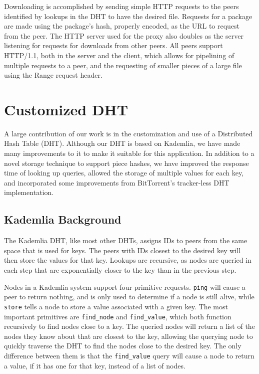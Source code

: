 \documentclass[conference]{IEEEtran}
\begin{document}
Downloading is accomplished by sending simple HTTP requests to the
peers identified by lookups in the DHT to have the desired file.
Requests for a package are made using the package's hash, properly
encoded, as the URL to request from the peer. The HTTP server used
for the proxy also doubles as the server listening for requests for
downloads from other peers. All peers support HTTP/1.1, both in the
server and the client, which allows for pipelining of multiple
requests to a peer, and the requesting of smaller pieces of a large
file using the Range request header.


\section{Customized DHT}
\label{custom_dht}

A large contribution of our work is in the customization and use of
a Distributed Hash Table (DHT). Although our DHT is based on
Kademlia, we have made many improvements to it to make it suitable
for this application. In addition to a novel storage technique to
support piece hashes, we have improved the response time of looking
up queries, allowed the storage of multiple values for each key, and
incorporated some improvements from BitTorrent's tracker-less DHT
implementation.

\subsection{Kademlia Background}
\label{kademlia}

The Kademlia DHT, like most other DHTs, assigns IDs to peers from
the same space that is used for keys. The peers with IDs closest to
the desired key will then store the values for that key. Lookups are
recursive, as nodes are queried in each step that are exponentially
closer to the key than in the previous step.

Nodes in a Kademlia system support four primitive requests.
\texttt{ping} will cause a peer to return nothing, and is only used
to determine if a node is still alive, while \texttt{store} tells a
node to store a value associated with a given key. The most
important primitives are \texttt{find\_node} and
\texttt{find\_value}, which both function recursively to find nodes
close to a key. The queried nodes will return a list of the nodes
they know about that are closest to the key, allowing the querying
node to quickly traverse the DHT to find the nodes close to the
desired key. The only difference between them is that the
\texttt{find\_value} query will cause a node to return a value, if
it has one for that key, instead of a list of nodes.
\end{document}
